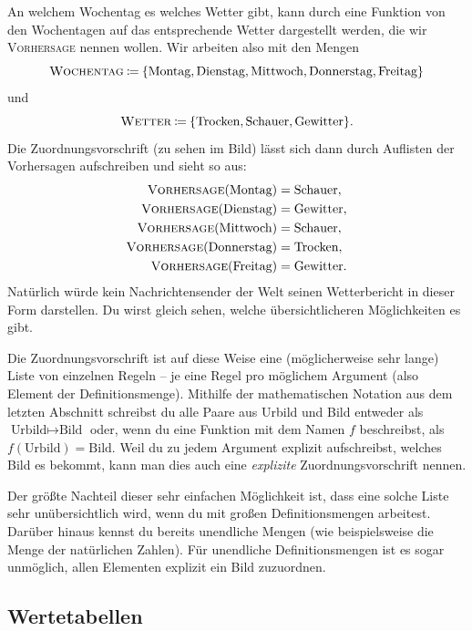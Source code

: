 \documentclass[../../main.tex]{subfiles}
\begin{document}
\begin{example}{}
    An welchem Wochentag es welches Wetter gibt, kann durch eine Funktion von den Wochentagen auf das entsprechende Wetter dargestellt werden, die wir \textsc{Vorhersage} nennen wollen. Wir arbeiten also mit den Mengen \[\textsc{Wochentag}\mathbin{\coloneqq}\{\text{Montag},\text{Dienstag},\text{Mittwoch},\text{Donnerstag},\text{Freitag}\}\] und \[\textsc{Wetter}\mathbin{\coloneqq}\{\text{Trocken},\text{Schauer},\text{Gewitter}\}.\]
    Die Zuordnungsvorschrift (zu sehen im Bild) lässt sich dann durch Auflisten der Vorhersagen aufschreiben und sieht so aus:
    \begin{align*}
        \textsc{Vorhersage}(\text{Montag})&=\text{Schauer},\\ \textsc{Vorhersage}(\text{Dienstag})&=\text{Gewitter},\\ \textsc{Vorhersage}(\text{Mittwoch})&=\text{Schauer},\\ \textsc{Vorhersage}(\text{Donnerstag})&=\text{Trocken},\\ \textsc{Vorhersage}(\text{Freitag})&=\text{Gewitter}.
    \end{align*}
    Natürlich würde kein Nachrichtensender der Welt seinen Wetterbericht in dieser Form darstellen. Du wirst gleich sehen, welche übersichtlicheren Möglichkeiten es gibt.
\end{example}

Die Zuordnungsvorschrift ist auf diese Weise eine (möglicherweise sehr lange) Liste von einzelnen Regeln -- je eine Regel pro möglichem Argument (also Element der Definitionsmenge).
Mithilfe der mathematischen Notation aus dem letzten Abschnitt schreibst du alle Paare aus Urbild und Bild entweder als \mbox{$\text{Urbild}\mapsto\text{Bild}$} oder, wenn du eine Funktion mit dem Namen $f$ beschreibst, als \mbox{$f(\text{Urbild})=\text{Bild}$}. Weil du zu jedem Argument explizit aufschreibst, welches Bild es bekommt, kann man dies auch eine \emph{explizite} Zuordnungsvorschrift nennen.

Der größte Nachteil dieser sehr einfachen Möglichkeit ist, dass eine solche Liste sehr unübersichtlich wird, wenn du mit großen Definitionsmengen arbeitest. Darüber hinaus kennst du bereits unendliche Mengen (wie beispielsweise die Menge \Natural{} der natürlichen Zahlen). Für unendliche Definitionsmengen ist es sogar unmöglich, allen Elementen explizit ein Bild zuzuordnen.

\subsection{Wertetabellen}
\label{sec:abbildungen_wertetabellen}
\end{document}
